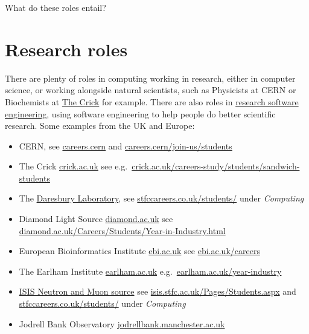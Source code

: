 \documentclass[
]{book}
\providecommand{\tightlist}{%
  \setlength{\itemsep}{0pt}\setlength{\parskip}{0pt}}
\begin{document}
What do these roles entail?

\hypertarget{rse}{%
\section{Research roles}\label{rse}}

There are plenty of roles in computing working in research, either in computer science, or working alongside natural scientists, such as Physicists at CERN or Biochemists at \href{https://en.wikipedia.org/wiki/Francis_Crick_Institute}{The Crick} for example. There are also roles in \href{https://society-rse.org/}{research software engineering}, using software engineering to help people do better scientific research. Some examples from the UK and Europe:

\begin{itemize}
\tightlist
\item
  CERN, see \href{https://careers.cern/}{careers.cern} and \href{https://careers.cern/join-us/students}{careers.cern/join-us/students}
\item
  The Crick \href{https://www.crick.ac.uk/}{crick.ac.uk} see e.g.~\href{https://www.crick.ac.uk/careers-study/students/sandwich-students}{crick.ac.uk/careers-study/students/sandwich-students}
\item
  The \href{https://en.wikipedia.org/wiki/Daresbury_Laboratory}{Daresbury Laboratory}, see \href{https://stfccareers.co.uk/students/}{stfccareers.co.uk/students/} under \emph{Computing}
\item
  Diamond Light Source \href{https://www.diamond.ac.uk/}{diamond.ac.uk} see \href{https://www.diamond.ac.uk/Careers/Students/Year-in-Industry.html}{diamond.ac.uk/Careers/Students/Year-in-Industry.html}
\item
  European Bioinformatics Institute \href{https://www.ebi.ac.uk/}{ebi.ac.uk} see \href{https://www.ebi.ac.uk/careers}{ebi.ac.uk/careers}
\item
  The Earlham Institute \href{https://www.earlham.ac.uk/}{earlham.ac.uk} e.g.~\href{https://www.earlham.ac.uk/year-industry}{earlham.ac.uk/year-industry}
\item
  \href{https://en.wikipedia.org/wiki/ISIS_Neutron_and_Muon_Source}{ISIS Neutron and Muon source} see \href{https://www.isis.stfc.ac.uk/Pages/Students.aspx}{isis.stfc.ac.uk/Pages/Students.aspx} and \href{https://stfccareers.co.uk/students/}{stfccareers.co.uk/students/} under \emph{Computing}
\item
  Jodrell Bank Observatory \href{https://www.jodrellbank.manchester.ac.uk/}{jodrellbank.manchester.ac.uk}

\end{itemize}
\end{document}
